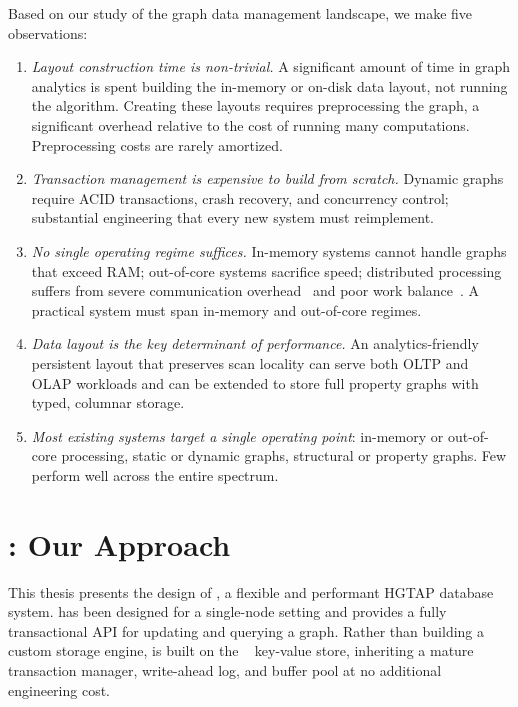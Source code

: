 Based on our study of the graph data management landscape, we make five observations:
\begin{enumerate}
  \item \textit{Layout construction time is non-trivial.} A significant amount of time in graph analytics is spent building the in-memory or on-disk data layout, not running the algorithm. Creating these layouts requires preprocessing the graph, a significant overhead relative to the cost of running many computations. Preprocessing costs are rarely amortized.
  \item \textit{Transaction management is expensive to build from scratch.} Dynamic graphs require ACID transactions, crash recovery, and concurrency control; substantial engineering that every new system must reimplement.
  \item \textit{No single operating regime suffices.} In-memory systems cannot handle graphs that exceed RAM; out-of-core systems sacrifice speed; distributed processing suffers from severe communication overhead~\cite{mcsherry2015scalability,beamer2016understanding} and poor work balance~\cite{hajidehi2023cuttana}. A practical system must span in-memory and out-of-core regimes.
  \item \textit{Data layout is the key determinant of performance.} An analytics-friendly persistent layout that preserves scan locality can serve both OLTP and OLAP workloads and can be extended to store full property graphs with typed, columnar storage.
  \item \textit{Most existing systems target a single operating point}: in-memory or out-of-core processing, static or dynamic graphs, structural or property graphs. Few perform well across the entire spectrum.
\end{enumerate}

\section{\project{}: Our Approach}
\label{sec:intro:flexograph}

This thesis presents the design of \project{}, a flexible and performant \ac{HGTAP} database system.
\project{} has been designed for a single-node setting and provides a fully transactional \ac{API} for updating and querying a graph.
Rather than building a custom storage engine, \project{} is built on the \wt{}~\cite{WiredTigerDocumentation} key-value store, inheriting a mature transaction manager, write-ahead log, and buffer pool at no additional engineering cost.

